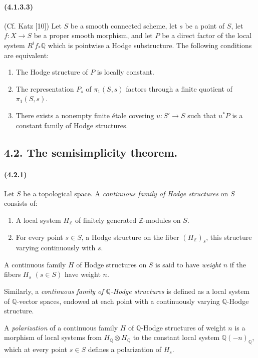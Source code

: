 \documentclass[10pt]{article}
\newcommand{\Q}{\mathbb Q}
\newcommand{\Z}{\mathbb Z}
\begin{document}
\paragraph{(4.1.3.3)} (Cf. Katz [10]) Let $S$ be a smooth connected scheme, let $s$ be a point of $S$, let $f:X\to S$ be a proper smooth morphism, and let $P$ be a direct factor of the local system $R^if_*\Q$ which is pointwise a Hodge substructure. The following conditions are equivalent:
\begin{enumerate}[label=\alph*)]
\item The Hodge structure of $P$ is locally constant.
\item The representation $P_s$ of $\pi_1(S,s)$ factors through a finite quotient of $\pi_1(S,s)$.
\item There exists a nonempty finite étale covering $u:S'\to S$ such that $u^*P$ is a constant family of Hodge structures.
\end{enumerate}

\subsection*{4.2. The semisimplicity theorem.}

\paragraph{(4.2.1)} Let $S$ be a topological space. A \emph{continuous family of Hodge structures} on $S$ consists of:
\begin{enumerate}[label=\alph*)]
\item A local system $H_\Z$ of finitely generated $\Z$-modules on $S$.
\item For every point $s\in S$, a Hodge structure on the fiber $(H_\Z)_s$, this structure varying continuously with $s$.
\end{enumerate}
A continuous family $H$ of Hodge structures on $S$ is said to have \emph{weight $n$} if the fibers $H_s$ $(s\in S)$ have weight $n$.

Similarly, a \emph{continuous family of $\Q$-Hodge structures} is defined as a local system of $\Q$-vector spaces, endowed at each point with a continuously varying $\Q$-Hodge structure.

A \emph{polarization} of a continuous family $H$ of $\Q$-Hodge structures of weight $n$ is a morphism of local systems from $H_\Q\otimes H_\Q$ to the constant local system $\Q(-n)_\Q$, which at every point $s\in S$ defines a polarization of $H_s$.
\end{document}

